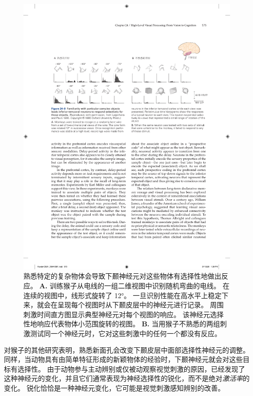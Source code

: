 \begin{figure}[htbp]
	\centering
	\includegraphics[width=1.0\linewidth]{chap24/fig_24_9}
	\caption{熟悉特定的复杂物体会导致下颞神经元对这些物体有选择性地做出反应。
		\textbf{A.} 训练猴子从电线的一组二维视图中识别随机弯曲的电线。 在连续的视图中，线形式旋转了 12°。
		一旦识别性能在高水平上稳定下来，就会在呈现每个视图时从下颞皮层中的神经元进行记录。
		周围刺激时间直方图显示典型神经元对每个视图的响应。
		该神经元选择性地响应代表物体小范围旋转的视图。
		\textbf{B.} 当用猴子不熟悉的两组刺激测试同一个神经元时，它对这些刺激中的任何一个都没有反应。}
	\label{fig:24_9}
\end{figure}


对猴子的其他研究表明，熟悉新面孔会改变下颞皮层中面部选择性神经元的调整。
同样，当动物具有由简单特征形成的新颖物体的经验时，下颞神经元就会对这些目标有选择性。
由于动物参与主动辨别或仅被动观察视觉刺激的原因，已经发现了这种神经元的变化，并且它们通常表现为神经选择性的锐化，而不是绝对\textit{激活率}的变化。
锐化恰恰是一种神经元变化，它可能是视觉刺激感知辨别的改善。



